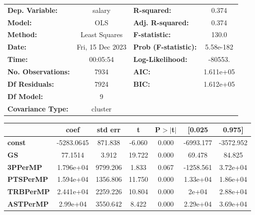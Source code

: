 \begin{center}
\begin{tabular}{lclc}
\toprule
\textbf{Dep. Variable:}    &      salary      & \textbf{  R-squared:         } &     0.374   \\
\textbf{Model:}            &       OLS        & \textbf{  Adj. R-squared:    } &     0.374   \\
\textbf{Method:}           &  Least Squares   & \textbf{  F-statistic:       } &     130.0   \\
\textbf{Date:}             & Fri, 15 Dec 2023 & \textbf{  Prob (F-statistic):} & 5.58e-182   \\
\textbf{Time:}             &     00:05:54     & \textbf{  Log-Likelihood:    } &   -80553.   \\
\textbf{No. Observations:} &        7934      & \textbf{  AIC:               } & 1.611e+05   \\
\textbf{Df Residuals:}     &        7924      & \textbf{  BIC:               } & 1.612e+05   \\
\textbf{Df Model:}         &           9      & \textbf{                     } &             \\
\textbf{Covariance Type:}  &     cluster      & \textbf{                     } &             \\
\bottomrule
\end{tabular}
\begin{tabular}{lcccccc}
                       & \textbf{coef} & \textbf{std err} & \textbf{t} & \textbf{P$> |$t$|$} & \textbf{[0.025} & \textbf{0.975]}  \\
\midrule
\textbf{const}         &   -5283.0645  &      871.838     &    -6.060  &         0.000        &    -6993.177    &    -3572.952     \\
\textbf{GS}            &      77.1514  &        3.912     &    19.722  &         0.000        &       69.478    &       84.825     \\
\textbf{3PPerMP}       &    1.796e+04  &     9799.206     &     1.833  &         0.067        &    -1258.561    &     3.72e+04     \\
\textbf{PTSPerMP}      &    1.594e+04  &     1356.806     &    11.750  &         0.000        &     1.33e+04    &     1.86e+04     \\
\textbf{TRBPerMP}      &    2.441e+04  &     2259.226     &    10.804  &         0.000        &        2e+04    &     2.88e+04     \\
\textbf{ASTPerMP}      &     2.99e+04  &     3550.642     &     8.422  &         0.000        &     2.29e+04    &     3.69e+04     \\

\end{tabular}
\end{center}
